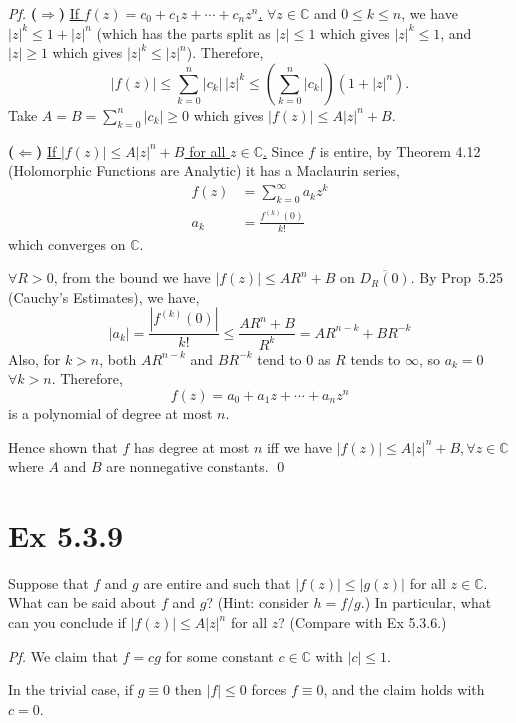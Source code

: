 \documentclass[a4paper]{article}
\newcommand{\C}{\mathbb{C}}
\begin{document}
\textit{Pf.} \textbf{($\Rightarrow$)} \underline{If $f(z) = c_0 + c_1 z + \cdots + c_n z^n$.}
$\forall z \in \C$ and $0 \leq k \leq n$, we have $|z|^k \leq 1 + |z|^n$ (which has the parts split as $|z| \leq 1$ which gives
$|z|^k \leq 1$, and $|z| \geq 1$ which gives $|z|^k \leq |z|^n$). Therefore,
\[
|f(z)| \leq \sum_{k=0}^n |c_k|\, |z|^k \leq \left(\sum_{k=0}^n |c_k|\right)(1 + |z|^n).
\]
Take $A = B = \sum_{k=0}^n |c_k| \geq 0$ which gives $|f(z)| \leq A|z|^n + B$.

\medskip
\textbf{($\Leftarrow$)} \underline{If $|f(z)| \leq A|z|^n + B$ for all $z \in \C$.} Since $f$
is entire, by Theorem 4.12 (Holomorphic Functions are Analytic) it has a Maclaurin
series,
\begin{align*}
f(z) &= \sum_{k=0}^\infty a_k z^k\\
a_k &= \frac{f^{(k)}(0)}{k!}
\end{align*}
which converges on $\C$.

\medskip
$\forall R > 0$, from the bound we have $|f(z)| \leq AR^n + B$ on $\overline{D_R(0)}$. By
Prop~5.25 (Cauchy's Estimates), we have,
\[
|a_k| = \frac{|f^{(k)}(0)|}{k!} \leq \frac{AR^n + B}{R^k} = AR^{n-k} + BR^{-k}
\]
Also, for $k > n$, both $AR^{n-k}$ and $BR^{-k}$ tend to $0$ as $R$ tends to $\infty$, so $a_k = 0$
$\forall k > n$. Therefore,
\[
f(z) = a_0 + a_1 z + \cdots + a_n z^n
\]
is a polynomial of degree at most $n$.

\medskip
Hence shown that $f$ has degree at most $n$ iff we have $|f(z)| \leq A|z|^n + B, \forall z \in \mathbb{C}$ where $A$ and $B$ are nonnegative constants. \qed

\newpage
\section*{Ex 5.3.9}

\begin{tcolorbox}[colback=gray!10, colframe=black, boxrule=0.5pt, arc=2mm]
Suppose that $f$ and $g$ are entire and such that $|f(z)| \leq |g(z)|$ for all
$z \in \C$. What can be said about $f$ and $g$? (Hint: consider $h = f/g$.) In
particular, what can you conclude if $|f(z)| \leq A|z|^n$ for all $z$?
(Compare with Ex 5.3.6.)
\end{tcolorbox}

\textit{Pf.} We claim that $f = cg$ for some constant $c \in \C$ with $|c| \leq 1$.

\medskip
In the trivial case, if $g \equiv 0$ then $|f| \leq 0$ forces $f \equiv 0$, and the claim holds with $c = 0$.
\end{document}
